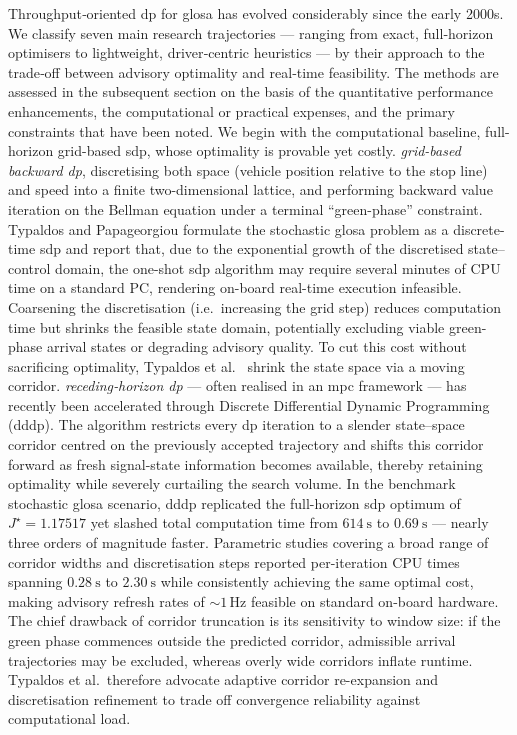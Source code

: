 Throughput‐oriented \ac{dp} for \ac{glosa} has evolved considerably since the early 2000s. We classify seven main research trajectories --- ranging from exact, full‐horizon optimisers to lightweight, driver‐centric heuristics --- by their approach to the trade‐off between advisory optimality and real‐time feasibility. The methods are assessed in the subsequent section on the basis of the quantitative performance enhancements, the computational or practical expenses, and the primary constraints that have been noted.
\mynewline
We begin with the computational baseline, full-horizon grid-based \ac{sdp}, whose optimality is provable yet costly. \emph{grid-based backward \ac{dp}}, discretising both space (vehicle position relative to the stop line) and speed into a finite two-dimensional lattice, and performing backward value iteration on the Bellman equation under a terminal “green-phase” constraint. Typaldos and Papageorgiou \cite{Typaldos2021} formulate the stochastic \ac{glosa} problem as a discrete-time \ac{sdp} and report that, due to the exponential growth of the discretised state–control domain, the one-shot \ac{sdp} algorithm may require several minutes of CPU time on a standard PC, rendering on-board real-time execution infeasible. Coarsening the discretisation (i.e.\ increasing the grid step) reduces computation time but shrinks the feasible state domain, potentially excluding viable green-phase arrival states or degrading advisory quality.
\mynewline
To cut this cost without sacrificing optimality, Typaldos et al.~\cite{Typaldos2023} shrink the state space via a moving corridor. \textit{\ac{receding‐horizon} \ac{dp}} --- often realised in an \ac{mpc} framework --- has recently been accelerated through Discrete Differential Dynamic Programming (\ac{dddp}). The algorithm restricts every \ac{dp} iteration to a slender state–space corridor centred on the previously accepted trajectory and shifts this corridor forward as fresh signal-state information becomes available, thereby retaining optimality while severely curtailing the search volume. In the benchmark stochastic \ac{glosa} scenario, \ac{dddp} replicated the full-horizon \ac{sdp} optimum of $J^\star=1.17517$ yet slashed total computation time from $614\ \mathrm{s}$ to $0.69\ \mathrm{s}$ --- nearly three orders of magnitude faster. Parametric studies covering a broad range of corridor widths and discretisation steps reported per-iteration CPU times spanning $0.28\ \mathrm{s}$ to $2.30\ \mathrm{s}$ while consistently achieving the same optimal cost, making advisory refresh rates of \(\sim1\,\text{Hz}\) feasible on standard on-board hardware. The chief drawback of corridor truncation is its sensitivity to window size: if the green phase commences outside the predicted corridor, admissible arrival trajectories may be excluded, whereas overly wide corridors inflate runtime. Typaldos et al.\ therefore advocate adaptive corridor re-expansion and discretisation refinement to trade off convergence reliability against computational load. 
